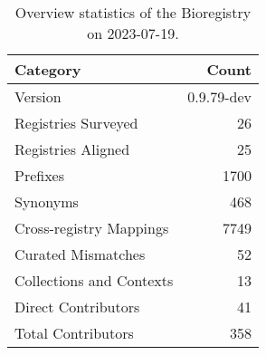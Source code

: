 \begin{table}
\caption{Overview statistics of the Bioregistry on 2023-07-19.}
\label{tab:bioregistry-summary}
\begin{tabular}{lr}
\toprule
Category & Count \\
\midrule
Version & 0.9.79-dev \\
Registries Surveyed & 26 \\
Registries Aligned & 25 \\
Prefixes & 1700 \\
Synonyms & 468 \\
Cross-registry Mappings & 7749 \\
Curated Mismatches & 52 \\
Collections and Contexts & 13 \\
Direct Contributors & 41 \\
Total Contributors & 358 \\
\bottomrule
\end{tabular}
\end{table}
